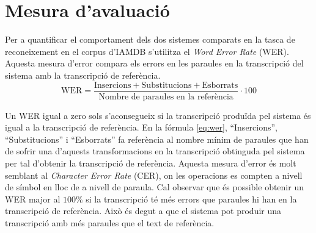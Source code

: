 \section{Mesura d'avaluació}
Per a quantificar el comportament dels dos sistemes comparats en la tasca de reconeixement en el corpus d'IAMDB s'utilitza el \emph{Word Error Rate} (WER). Aquesta mesura d'error compara els errors en les paraules en la transcripció del sistema amb la transcripció de referència.
\begin{equation}\label{eq:wer}
\text{WER} =  \frac{\text{Insercions} + \text{Substitucions} + \text{Esborrats}}{\text{Nombre de paraules en la referència}} \cdot 100
\end{equation}

Un WER igual a zero sols s'aconsegueix si la transcripció produïda pel sistema és igual a la transcripció de referència. En la fórmula \ref{eq:wer}, ``Insercions'', ``Substitucions'' i ``Esborrats'' fa referència al nombre mínim de paraules que han de sofrir una d'aquests transformacions en la transcripció obtinguda pel sistema per tal d'obtenir la transcripció de referència. Aquesta mesura d'error és molt semblant al \emph{Character Error Rate} (CER), on les operacions es compten a nivell de símbol en lloc de a nivell de paraula. Cal observar que és possible obtenir un WER major al $100\%$ si la transcripció té més errors que paraules hi han en la transcripció de referència. Això és degut a que el sistema pot produir una transcripció amb més paraules que el text de referència.

